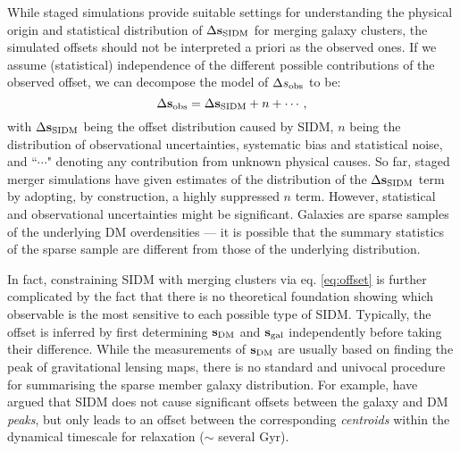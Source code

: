 \documentclass[usenatbib]{mn2e}
\newcommand{\offset}{\Delta {\bf s}}
\newcommand{\SIDM}{{\rm SIDM}}
\begin{document}
While staged simulations provide suitable settings for understanding the physical origin and statistical distribution of $\offset_{\SIDM}$
for merging galaxy clusters, the simulated offsets should not be interpreted a priori as the observed ones. 
If we assume (statistical) independence of 
the different possible contributions of the observed 
offset, we can decompose the model of $\Delta s_{\rm obs}$ to be:
\begin{equation}
	\offset_{\rm obs} = \offset_{\SIDM} + n + \cdots,
	\label{eq:signal_and_noise}
\end{equation}
with $\offset_{\SIDM}$ being the offset distribution caused by SIDM, $n$ being the distribution of observational uncertainties, systematic bias and statistical noise, and ``$\cdots$" denoting any contribution from unknown physical causes.
So far, staged merger simulations have given estimates of the distribution of the $\offset_{\SIDM}$ term by adopting, by construction,
a highly suppressed $n$ term. However, statistical and observational uncertainties might be significant. Galaxies are
sparse samples of the underlying DM overdensities --- it is possible that the 
summary statistics of the sparse sample are different from those of the 
underlying distribution.
  
In fact, constraining SIDM with merging clusters via eq. \ref{eq:offset} is further complicated by the fact that there is no theoretical
foundation showing which observable is the most sensitive to each
possible type of SIDM. Typically, the offset is inferred by first determining ${\bf s}_{\rm DM}$ 
and ${\bf s}_{\rm gal}$ independently before taking their difference. While the measurements of ${\bf s}_{\rm DM}$ are usually based on finding the peak of gravitational lensing maps, there is no standard and univocal procedure for summarising the sparse member galaxy distribution.
For example, \cite{Kahlhoefer14} have argued that SIDM 
does not cause significant offsets between the galaxy and DM {\it peaks}, but only leads to an offset
between the corresponding {\it centroids} within the dynamical timescale for
relaxation ($\sim$ several Gyr). 
\end{document}
